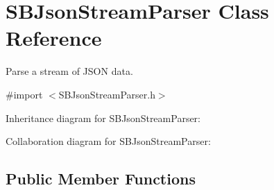 \hypertarget{interface_s_b_json_stream_parser}{
\section{\-S\-B\-Json\-Stream\-Parser \-Class \-Reference}
\label{interface_s_b_json_stream_parser}
}


\-Parse a stream of \-J\-S\-O\-N data.  




{\ttfamily \#import $<$\-S\-B\-Json\-Stream\-Parser.\-h$>$}



\-Inheritance diagram for \-S\-B\-Json\-Stream\-Parser\-:


\-Collaboration diagram for \-S\-B\-Json\-Stream\-Parser\-:
\subsection*{\-Public \-Member \-Functions}
